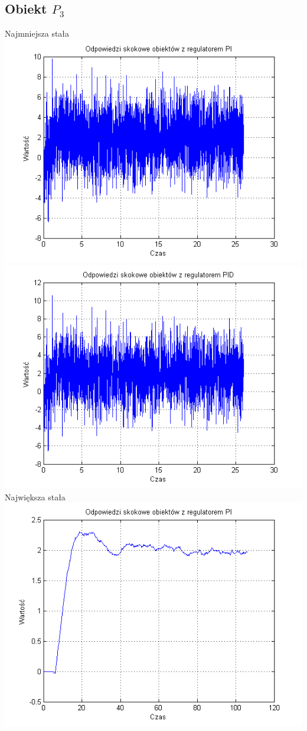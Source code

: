 \documentclass[10pt,a4paper]{article}
\begin{document}
\subsection*{Obiekt $P_3$}
Najmniejsza stała\\
\includegraphics[scale=1]{images/trzy/skrypt_05.png}\\
\includegraphics[scale=1]{images/cztery/skrypt_05.png}\\
Największa stała\\
\includegraphics[scale=1]{images/trzy/skrypt_06.png}\\
\end{document}
